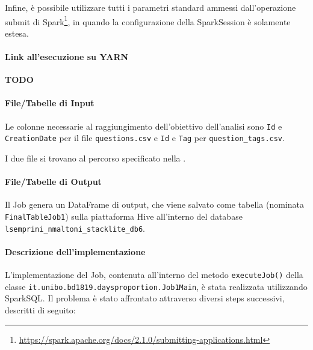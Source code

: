   Infine, è possibile utilizzare tutti i parametri standard ammessi dall'operazione submit di Spark\footnote{\url{https://spark.apache.org/docs/2.1.0/submitting-applications.html}},
  in quando la configurazione della SparkSession è solamente estesa.

  \paragraph{Link all'esecuzione su YARN}\label{par:job1:spark:yarn}

  \textbf{TODO}

  \paragraph{File/Tabelle di Input}\label{par:job1:spark:input}

  Le colonne necessarie al raggiungimento dell'obiettivo dell'analisi sono \texttt{Id} e \texttt{CreationDate} per il file \texttt{questions.csv}
  e \texttt{Id} e \texttt{Tag} per \texttt{question\_tags.csv}.

  I due file si trovano al percorso specificato nella .

  \paragraph{File/Tabelle di Output}\label{par:job1:spark:output}

  Il Job genera un DataFrame di output, che viene salvato come tabella (nominata \texttt{FinalTableJob1})
  sulla piattaforma Hive all'interno del database \texttt{lsemprini\_nmaltoni\_stacklite\_db6}.

  \paragraph{Descrizione dell'implementazione}\label{par:job1:spark:implementation}

  L'implementazione del Job, contenuta all'interno del metodo \texttt{executeJob()} della classe \texttt{it.unibo.bd1819.daysproportion.Job1Main}, %
  è stata realizzata utilizzando SparkSQL\@.
  Il problema è stato affrontato attraverso diversi steps successivi, descritti di seguito:

